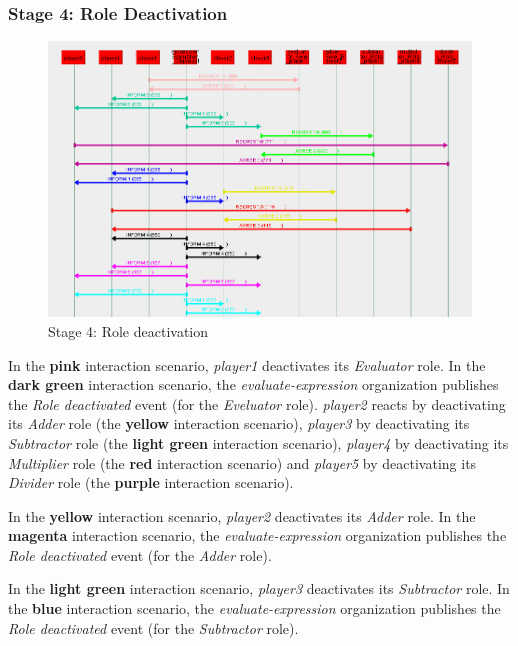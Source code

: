 \subsubsection*{Stage 4: Role Deactivation}

\begin{figure}[H]
	\centering
	\includegraphics[width=\textwidth]{images/examples/example2-stage4.png}
	\caption{Stage 4: Role deactivation}
	\label{figure:example2-stage4}
\end{figure}

In the \textbf{pink} interaction scenario, \textit{player1} deactivates its \textit{Evaluator} role.
In the \textbf{dark green} interaction scenario, the \textit{evaluate-expression} organization publishes the \textit{Role deactivated} event (for the \textit{Eveluator} role).
\textit{player2} reacts by deactivating its \textit{Adder} role (the \textbf{yellow} interaction scenario), \textit{player3} by deactivating its \textit{Subtractor} role (the \textbf{light green} interaction scenario), \textit{player4} by deactivating its \textit{Multiplier} role (the \textbf{red} interaction scenario) and \textit{player5} by deactivating its \textit{Divider} role (the \textbf{purple} interaction scenario).

In the \textbf{yellow} interaction scenario, \textit{player2} deactivates its \textit{Adder} role.
In the \textbf{magenta} interaction scenario, the \textit{evaluate-expression} organization publishes the \textit{Role deactivated} event (for the \textit{Adder} role).

In the \textbf{light green} interaction scenario, \textit{player3} deactivates its \textit{Subtractor} role.
In the \textbf{blue} interaction scenario, the \textit{evaluate-expression} organization publishes the \textit{Role deactivated} event (for the \textit{Subtractor} role).

